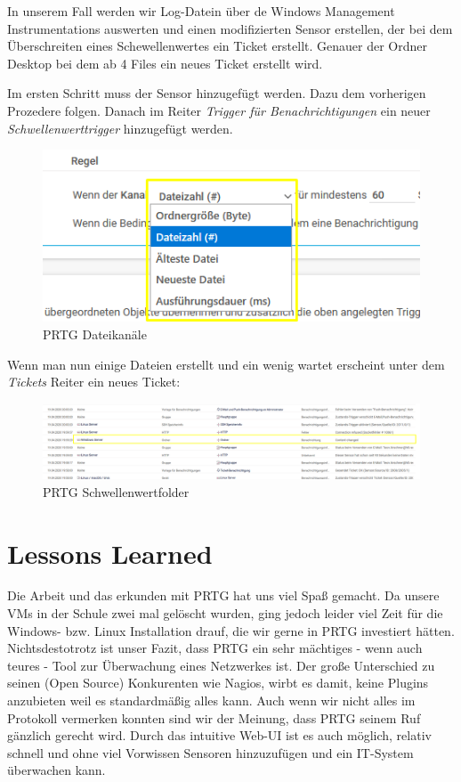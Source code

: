 In unserem Fall werden wir Log-Datein über de Windows Management
Instrumentations auswerten und einen modifizierten Sensor erstellen, der
bei dem Überschreiten eines Schewellenwertes ein Ticket erstellt.
Genauer der Ordner Desktop bei dem ab 4 Files ein neues Ticket erstellt
wird.

Im ersten Schritt muss der Sensor hinzugefügt werden. Dazu dem
vorherigen Prozedere folgen. Danach im Reiter \emph{Trigger für
Benachrichtigungen} ein neuer \emph{Schwellenwerttrigger} hinzugefügt
werden.

\begin{figure}[!htb]
\centering
\includegraphics{./images/prtg_kanal.png}
\caption{PRTG Dateikanäle}
\end{figure}

Wenn man nun einige Dateien erstellt und ein wenig wartet erscheint
unter dem \emph{Tickets} Reiter ein neues Ticket:

\begin{figure}[!htb]
\centering
\includegraphics{./images/prtg-ticket-folder.png}
\caption{PRTG Schwellenwertfolder}
\end{figure}

\hypertarget{lessons-learned}{%
\section{Lessons Learned}\label{lessons-learned}}

Die Arbeit und das erkunden mit PRTG hat uns viel Spaß gemacht. Da
unsere VMs in der Schule zwei mal gelöscht wurden, ging jedoch leider
viel Zeit für die Windows- bzw. Linux Installation drauf, die wir gerne
in PRTG investiert hätten. Nichtsdestotrotz ist unser Fazit, dass PRTG
ein sehr mächtiges - wenn auch teures - Tool zur Überwachung eines
Netzwerkes ist. Der große Unterschied zu seinen (Open Source)
Konkurenten wie Nagios, wirbt es damit, keine Plugins anzubieten weil es
standardmäßig alles kann. Auch wenn wir nicht alles im Protokoll
vermerken konnten sind wir der Meinung, dass PRTG seinem Ruf gänzlich
gerecht wird. Durch das intuitive Web-UI ist es auch möglich, relativ
schnell und ohne viel Vorwissen Sensoren hinzuzufügen und ein IT-System
überwachen kann.
